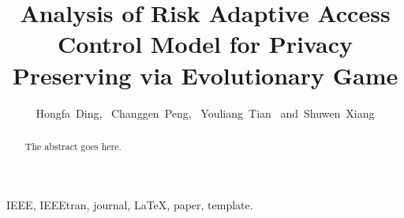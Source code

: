 \documentclass[journal]{IEEEtran}
\begin{document}
\title{Analysis of Risk Adaptive Access Control Model for Privacy Preserving via Evolutionary Game}

\author{Hongfa~Ding,~
        Changgen~Peng,~
        Youliang~Tian~
        and~Shuwen~Xiang%
}

% 











\maketitle

\begin{abstract}
The abstract goes here.
\end{abstract}

\begin{IEEEkeywords}
IEEE, IEEEtran, journal, \LaTeX, paper, template.
\end{IEEEkeywords}
\end{document}
